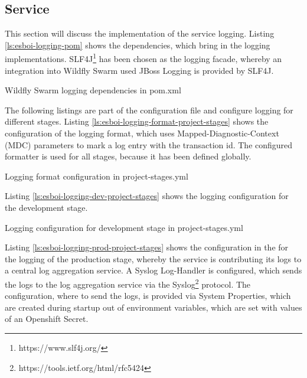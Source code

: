 \subsection{Service}
\label{sec:esbi-logging-service}
This section will discuss the implementation of the service logging. Listing \vref{ls:esboi-logging-pom} shows the dependencies, which bring in the logging implementations. SLF4J\footnote{https://www.slf4j.org/} has been chosen as the logging facade, whereby an integration into Wildfly Swarm used JBoss Logging is provided by SLF4J.

\begin{listing}[h]
	\caption{Wildfly Swarm logging dependencies in pom.xml}
	\label{ls:esboi-logging-pom}
\end{listing}

The following listings are part of the  configuration file and configure logging for different stages. Listing \vref{ls:esboi-logging-format-project-stages} shows the configuration of the logging format, which uses Mapped-Diagnostic-Context (MDC) parameters to mark a log entry with the transaction id. The configured formatter is used for all stages, because it has been defined globally.

\begin{listing}[h]
	\caption{Logging format configuration in project-stages.yml}
	\label{ls:esboi-logging-format-project-stages}
\end{listing}

Listing \vref{ls:esboi-logging-dev-project-stages} shows the logging configuration for the development stage.

\begin{listing}[h]
	\caption{Logging configuration for development stage in project-stages.yml}
	\label{ls:esboi-logging-dev-project-stages}
\end{listing}

Listing \vref{ls:esboi-logging-prod-project-stages} shows the configuration in the  for the logging of the production stage, whereby the service is contributing its logs to a central log aggregation service. A Syslog Log-Handler is configured, which sends the logs to the log aggregation service via the Syslog\footnote{https://tools.ietf.org/html/rfc5424} protocol. The configuration, where to send the logs, is provided via System Properties, which are created during startup out of environment variables, which are set with values of an Openshift Secret. \\

